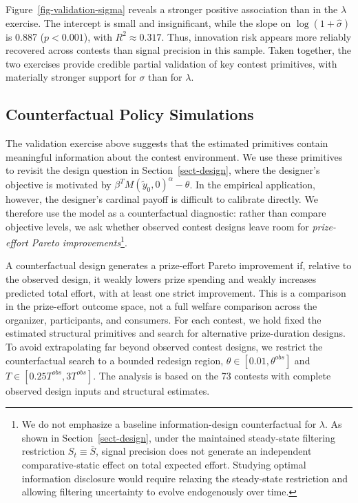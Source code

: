 \documentclass[mnsc]{informs3}
\begin{document}
Figure~\ref{fig-validation-sigma} reveals a stronger positive association than in the $\lambda$ exercise.
The intercept is small and insignificant, while the slope on $\log(1+\hat{\sigma})$ is 0.887 ($p<0.001$), with $R^2\approx0.317$.
Thus, innovation risk appears more reliably recovered across contests than signal precision in this sample.
Taken together, the two exercises provide credible partial validation of key contest primitives, with materially stronger support for $\sigma$ than for $\lambda$.


\subsection{Counterfactual Policy Simulations}

The validation exercise above suggests that the estimated primitives contain
meaningful information about the contest environment. We use these primitives to
revisit the design question in Section~\ref{sect-design}, where the designer's
objective is motivated by $\beta^{T}M(\tilde{y}_0,0)^\alpha-\theta$. In the
empirical application, however, the designer's cardinal payoff is difficult to
calibrate directly. We therefore use the model as a counterfactual diagnostic:
rather than compare objective levels, we ask whether observed contest designs
leave room for \textit{prize-effort Pareto improvements}\footnote{
We do not emphasize a baseline information-design counterfactual for
$\lambda$. As shown in Section~\ref{sect-design}, under the maintained
steady-state filtering restriction $S_t\equiv\bar S$, signal precision does not
generate an independent comparative-static effect on total expected effort.
Studying optimal information disclosure would require relaxing the steady-state
restriction and allowing filtering uncertainty to evolve endogenously over time.
}.

A counterfactual design generates a prize-effort Pareto improvement if, relative
to the observed design, it weakly lowers prize spending and weakly increases
predicted total effort, with at least one strict improvement. This is a
comparison in the prize-effort outcome space, not a full welfare comparison
across the organizer, participants, and consumers. For each contest, we hold
fixed the estimated structural primitives and search for alternative
prize-duration designs. To avoid extrapolating far beyond observed contest
designs, we restrict the counterfactual search to a bounded redesign region,
$\theta\in[0.01,\theta^{obs}]$ and
$T\in[0.25T^{obs},3T^{obs}]$. The analysis is based on the 73 contests with
complete observed design inputs and structural estimates.
\end{document}
